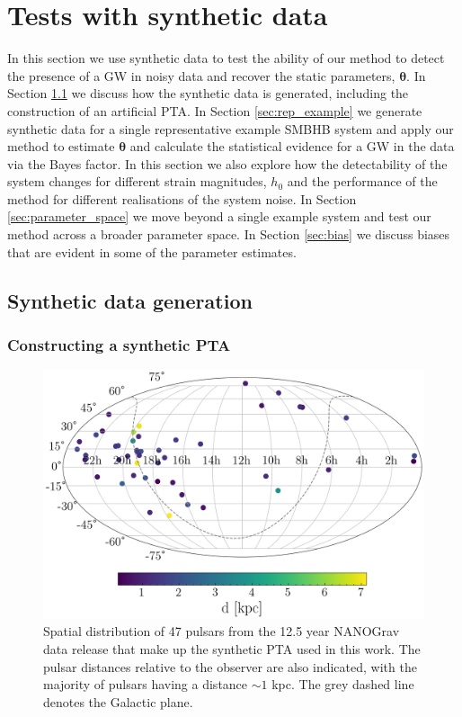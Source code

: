 \documentclass[fleqn,usenatbib,useAMS]{mnras}
\begin{document}
\section{Tests with synthetic data} \label{sec:testing}
In this section we use synthetic data to test the ability of our method to detect the presence of a GW in noisy data and recover the static parameters, $\boldsymbol{\theta}$. In Section \ref{sec:synth_data} we discuss how the synthetic data is generated, including the construction of an artificial PTA. In Section \ref{sec:rep_example} we generate synthetic data for a single representative example SMBHB system and apply our method to estimate $\boldsymbol{\theta}$ and calculate the statistical evidence for a GW in the data via the Bayes factor. In this section we also explore how the detectability of the system changes for different strain magnitudes, $h_0$ and the performance of the method for different realisations of the system noise. In Section \ref{sec:parameter_space} we move beyond a single example system and test our method across a broader parameter space. In Section \ref{sec:bias} we discuss biases that are evident in some of the parameter estimates.

\subsection{Synthetic data generation} \label{sec:synth_data}

\subsubsection{Constructing a synthetic PTA}\label{sec:synt_pta}

\begin{figure}
	\includegraphics[width=\columnwidth]{images/pulsar_distribution}
	\caption{Spatial distribution of 47 pulsars from the 12.5 year NANOGrav data release that make up the synthetic PTA used in this work. The pulsar distances relative to the observer are also indicated, with the majority of pulsars having a distance $\sim 1$ kpc. The grey dashed line denotes the Galactic plane.}
	\label{fig:pulsar_distrib}
\end{figure}
\end{document}
